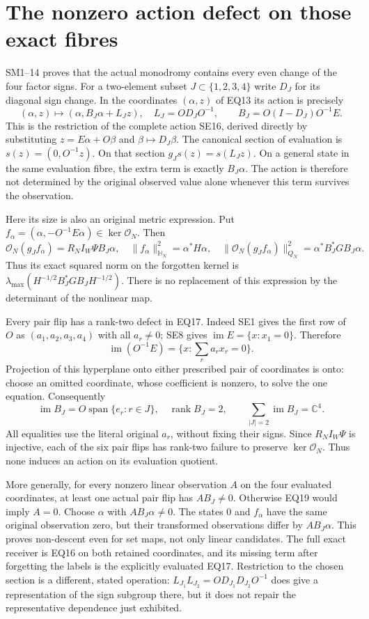 \documentclass[11pt]{article}
\newcommand{\C}{\mathbb C}
\newcommand{\im}{\operatorname{im}}
\newcommand{\rank}{\operatorname{rank}}
\begin{document}
\section{The nonzero action defect on those exact fibres}
SM1--14 \cite{FC} proves that the actual monodromy contains every
even change of the four factor signs. For a two-element subset
$J\subset\{1,2,3,4\}$ write $D_J$ for its diagonal sign change.
In the coordinates $(\alpha,z)$ of EQ13 its action is precisely
\[
 (\alpha,z)\longmapsto(\alpha,B_J\alpha+L_Jz),\quad
 L_J=OD_JO^{-1},\qquad B_J=O(I-D_J)O^{-1}E.                           \tag{EQ16}
\]
This is the restriction of the complete action SE16, derived directly
by substituting $z=E\alpha+O\beta$ and $\beta\mapsto D_J\beta$.
The canonical section of evaluation is $s(z)=(0,O^{-1}z)$.
On that section $g_Js(z)=s(L_Jz)$. On a general state in the
same evaluation fibre, the extra term is exactly $B_J\alpha$.
The action is therefore not determined by the original observed
value alone whenever this term survives the observation.

Here its size is also an original metric expression. Put
$f_\alpha=(\alpha,-O^{-1}E\alpha)\in\ker\mathcal O_N$. Then
\[
 \mathcal O_N(g_J f_\alpha)=R_NI_W\Psi B_J\alpha,\quad
 \|f_\alpha\|_{\mathbb H_N}^2=\alpha^*H\alpha,\quad
 \|\mathcal O_N(g_J f_\alpha)\|_{Q_N}^2
       =\alpha^*B_J^*GB_J\alpha.                                   \tag{EQ17}
\]
Thus its exact squared norm on the forgotten kernel is
$\lambda_{\max}(H^{-1/2}B_J^*GB_JH^{-1/2})$. There is no replacement
of this expression by the determinant of the nonlinear map.

Every pair flip has a rank-two defect in EQ17. Indeed SE1 gives
the first row of $O$ as $(a_1,a_2,a_3,a_4)$ with all $a_r\ne0$;
SE8 gives $\im E=\{x:x_1=0\}$. Therefore
\[
 \im(O^{-1}E)=\{x:\textstyle\sum_r a_rx_r=0\}.                     \tag{EQ18}
\]
Projection of this hyperplane onto either prescribed pair of
coordinates is onto: choose an omitted coordinate, whose coefficient
is nonzero, to solve the one equation. Consequently
\[
 \im B_J=O\operatorname{span}\{e_r:r\in J\},\quad\rank B_J=2,
 \qquad\sum_{|J|=2}\im B_J=\C^4.                                  \tag{EQ19}
\]
All equalities use the literal original $a_r$, without fixing their
signs. Since $R_NI_W\Psi$ is injective, each of the six pair flips
has rank-two failure to preserve $\ker\mathcal O_N$.
Thus none induces an action on its evaluation quotient.

More generally, for every nonzero linear observation $A$ on the
four evaluated coordinates, at least one actual pair flip has
$AB_J\ne0$. Otherwise EQ19 would imply $A=0$. Choose $\alpha$
with $AB_J\alpha\ne0$. The states $0$ and $f_\alpha$ have the same
original observation zero, but their transformed observations differ
by $AB_J\alpha$. This proves non-descent even for set maps, not only
linear candidates. The full exact receiver is EQ16 on both retained
coordinates, and its missing term after forgetting the labels is
the explicitly evaluated EQ17. Restriction to the chosen section
is a different, stated operation: $L_{J_1}L_{J_2}=OD_{J_1}D_{J_2}O^{-1}$
does give a representation of the sign subgroup there, but it does
not repair the representative dependence just exhibited.
\end{document}
